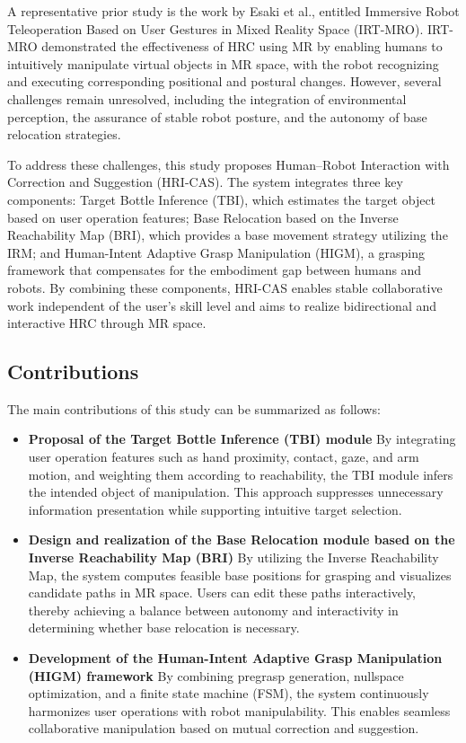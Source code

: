 \documentclass[../../main.tex]{subfiles} %
\begin{document}
A representative prior study is the work by Esaki et al., 
entitled Immersive Robot Teleoperation Based on User Gestures in Mixed Reality Space (IRT-MRO)\cite{Esaki}. 
IRT-MRO demonstrated the effectiveness of HRC using MR by enabling humans to intuitively 
manipulate virtual objects in MR space, with the robot recognizing and executing corresponding positional 
and postural changes. However, several challenges remain unresolved, including the integration of environmental 
perception, the assurance of stable robot posture, and the autonomy of base relocation strategies.

To address these challenges, this study proposes Human–Robot Interaction with Correction and Suggestion (HRI-CAS). 
The system integrates three key components: Target Bottle Inference (TBI), 
which estimates the target object based on user operation features; Base Relocation based on the Inverse Reachability Map (BRI), 
which provides a base movement strategy utilizing the IRM; and Human-Intent Adaptive Grasp Manipulation (HIGM), 
a grasping framework that compensates for the embodiment gap between humans and robots. 
By combining these components, 
HRI-CAS enables stable collaborative work independent of the user’s skill level and aims to realize bidirectional and interactive HRC through MR space.

\subsection*{Contributions}

The main contributions of this study can be summarized as follows:

\begin{itemize}
  \item \textbf{Proposal of the Target Bottle Inference (TBI) module}  
  By integrating user operation features such as hand proximity, contact, gaze, and arm motion, 
  and weighting them according to reachability, the TBI module infers the intended object of manipulation. 
  This approach suppresses unnecessary information presentation while supporting intuitive target selection.
  \item \textbf{Design and realization of the Base Relocation module based on the Inverse Reachability Map (BRI)}  
  By utilizing the Inverse Reachability Map\cite{RM}, the system computes feasible base positions for grasping and 
  visualizes candidate paths in MR space. Users can edit these paths interactively, thereby achieving a balance 
  between autonomy and interactivity in determining whether base relocation is necessary.
  \item \textbf{Development of the Human-Intent Adaptive Grasp Manipulation (HIGM) framework} 
  By combining pregrasp generation, nullspace optimization, and a finite state machine (FSM), 
  the system continuously harmonizes user operations with robot manipulability. 
  This enables seamless collaborative manipulation based on mutual correction and suggestion.
\end{itemize}
\end{document}
